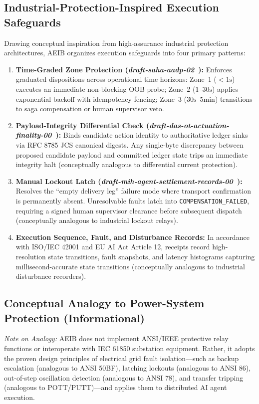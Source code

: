 \documentclass[10pt,journal,compsoc]{IEEEtran}
\begin{document}
\subsection{Industrial-Protection-Inspired Execution Safeguards}
Drawing conceptual inspiration from high-assurance industrial protection architectures, AEIB organizes execution safeguards into four primary patterns:
\begin{enumerate}
    \item \textbf{Time-Graded Zone Protection (\emph{draft-saha-aadp-02}~\cite{saha2026aadp}):} Enforces graduated dispositions across operational time horizons: Zone~1 ($<1\text{s}$) executes an immediate non-blocking OOB probe; Zone~2 ($1\text{--}30\text{s}$) applies exponential backoff with idempotency fencing; Zone~3 ($30\text{s}\text{--}5\text{min}$) transitions to saga compensation or human supervisor veto.
    \item \textbf{Payload-Integrity Differential Check (\emph{draft-das-ot-actuation-finality-00}~\cite{das2026ot}):} Binds candidate action identity to authoritative ledger sinks via RFC 8785 JCS canonical digests. Any single-byte discrepancy between proposed candidate payload and committed ledger state trips an immediate integrity halt (conceptually analogous to differential current protection).
    \item \textbf{Manual Lockout Latch (\emph{draft-mih-agent-settlement-records-00}~\cite{mih2026settlement}):} Resolves the ``empty delivery leg'' failure mode where transport confirmation is permanently absent. Unresolvable faults latch into \texttt{COMPENSATION\_FAILED}, requiring a signed human supervisor clearance before subsequent dispatch (conceptually analogous to industrial lockout relays).
    \item \textbf{Execution Sequence, Fault, and Disturbance Records:} In accordance with ISO/IEC 42001 and EU AI Act Article 12, receipts record high-resolution state transitions, fault snapshots, and latency histograms capturing millisecond-accurate state transitions (conceptually analogous to industrial disturbance recorders).
\end{enumerate}

\subsection{Conceptual Analogy to Power-System Protection (Informational)}
\emph{Note on Analogy:} AEIB does not implement ANSI/IEEE protective relay functions or interoperate with IEC 61850 substation equipment. Rather, it adopts the proven design principles of electrical grid fault isolation—such as backup escalation (analogous to ANSI 50BF), latching lockouts (analogous to ANSI 86), out-of-step oscillation detection (analogous to ANSI 78), and transfer tripping (analogous to POTT/PUTT)—and applies them to distributed AI agent execution.
\end{document}
